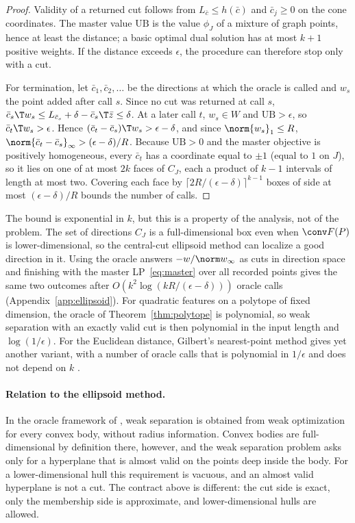 \begin{proof}
Validity of a returned cut follows from $L_{\bar c}\le h(\bar c)$ and
$\bar c_j\ge0$ on the cone coordinates. The master value $\mathrm{UB}$ is
the value $\phi_J$ of a mixture of graph points, hence at least the
distance; a basic optimal dual solution has at most $k+1$ positive weights.
If the distance exceeds $\epsilon$, the procedure can therefore stop only
with a cut.

For termination, let $\bar c_1,\bar c_2,\dots$ be the directions at which the
oracle is called and $w_s$ the point added after call $s$. Since no cut was
returned at call $s$, $\bar c_s\T w_s\le L_{\bar c_s}+\delta-\bar c_s\T\bar z\le\delta$.
At a later call $t$, $w_s\in W$ and $\mathrm{UB}>\epsilon$, so
$\bar c_t\T w_s>\epsilon$. Hence $(\bar c_t-\bar c_s)\T w_s>\epsilon-\delta$, and
since $\norm{w_s}_1\le R$, $\norm{\bar c_t-\bar c_s}_\infty>(\epsilon-\delta)/R$.
Because $\mathrm{UB}>0$ and the master objective is positively homogeneous,
every $\bar c_t$ has a coordinate equal to $\pm1$ (equal to $1$ on $J$), so
it lies on one of at most $2k$ faces of $C_J$, each a product of $k-1$
intervals of length at most two. Covering each face by
$\lceil2R/(\epsilon-\delta)\rceil^{k-1}$ boxes of side at most
$(\epsilon-\delta)/R$ bounds the number of calls.
\end{proof}

The bound is exponential in $k$, but this is a property of the analysis,
not of the problem. The set of directions $C_J$ is a full-dimensional box
even when $\conv F(P)$ is lower-dimensional, so the central-cut ellipsoid
method can localize a good direction in it. Using the oracle answers
$-w/\norm w_\infty$ as cuts in direction space and finishing with the master
LP~\eqref{eq:master} over all recorded points gives the same two outcomes
after $O(k^2\log(kR/(\epsilon-\delta)))$ oracle calls
(Appendix~\ref{app:ellipsoid}). For quadratic features on a
polytope of fixed dimension, the oracle of Theorem~\ref{thm:polytope} is
polynomial, so weak separation with an exactly valid cut is then
polynomial in the input length and $\log(1/\epsilon)$. For the Euclidean
distance, Gilbert's nearest-point method gives yet another variant, with a
number of oracle calls that is polynomial in $1/\epsilon$ and does not depend
on $k$ \citep{Gilbert1966,BrierleyNavascuesVertesi2016}.

\paragraph{Relation to the ellipsoid method.}
In the oracle framework of \citet{GrotschelLovaszSchrijver1988}, weak
separation is obtained from weak optimization for every convex body,
without radius information. Convex bodies are full-dimensional by
definition there, however, and the weak separation problem asks only for a
hyperplane that is almost valid on the points deep inside the body. For a
lower-dimensional hull this requirement is vacuous, and an almost valid
hyperplane is not a cut. The contract above is different: the cut side is
exact, only the membership side is approximate, and lower-dimensional
hulls are allowed.

